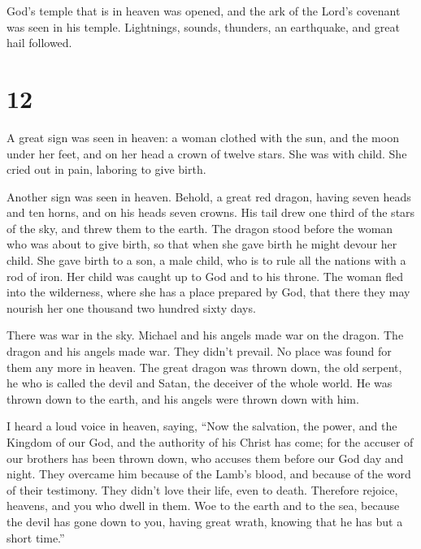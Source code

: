 God's temple that is in heaven was opened, and the ark
of the Lord's covenant was seen in his temple. Lightnings, sounds,
thunders, an earthquake, and great hail followed.

\hypertarget{section-11}{%
\section{12}\label{section-11}}

 A great sign was seen in heaven: a woman clothed with the
sun, and the moon under her feet, and on her head a crown of twelve
stars.  She was with child. She cried out in pain,
laboring to give birth.

 Another sign was seen in heaven. Behold, a great red
dragon, having seven heads and ten horns, and on his heads seven crowns.
 His tail drew one third of the stars of the sky, and
threw them to the earth. The dragon stood before the woman who was about
to give birth, so that when she gave birth he might devour her child.
 She gave birth to a son, a male child, who is to rule all
the nations with a rod of iron. Her child was caught up to God and to
his throne.  The woman fled into the wilderness, where she
has a place prepared by God, that there they may nourish her one
thousand two hundred sixty days.

 There was war in the sky. Michael and his angels made war
on the dragon. The dragon and his angels made war.  They
didn't prevail. No place was found for them any more in heaven.
 The great dragon was thrown down, the old serpent, he who
is called the devil and Satan, the deceiver of the whole world. He was
thrown down to the earth, and his angels were thrown down with him.

 I heard a loud voice in heaven, saying, ``Now the
salvation, the power, and the Kingdom of our God, and the authority of
his Christ has come; for the accuser of our brothers has been thrown
down, who accuses them before our God day and night. 
They overcame him because of the Lamb's blood, and because of the word
of their testimony. They didn't love their life, even to death.
 Therefore rejoice, heavens, and you who dwell in them.
Woe to the earth and to the sea, because the devil has gone down to you,
having great wrath, knowing that he has but a short time.''

